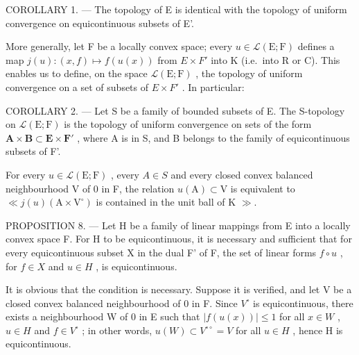 COROLLARY 1. --- The topology of E is identical with the topology of uniform convergence on equicontinuous subsets of E'.

More generally, let F be a locally convex space; every \(u \in \mathcal{L}(\mathrm{E}; \mathrm{F})\) defines a map \(j(u):(x, f) \mapsto f(u(x))\) from \(E \times F'\) into K (i.e.~into R or C). This enables us to define, on the space \(\mathcal{L}(\mathrm{E}; \mathrm{F})\) , the topology of uniform convergence on a set of subsets of \(E \times F'\) . In particular:

COROLLARY 2. --- Let S be a family of bounded subsets of E. The S-topology on \(\mathcal{L}(\mathrm{E};\mathrm{F})\) is the topology of uniform convergence on sets of the form \(\mathbf{A}\times\mathbf{B}\subset\mathbf{E}\times\mathbf{F}'\) , where A is in S, and B belongs to the family of equicontinuous subsets of F'.

For every \(u \in \mathcal{L}(\mathrm{E}; \mathrm{F})\) , every \(A \in S\) and every closed convex balanced neighbourhood V of 0 in F, the relation \(u(\mathrm{A}) \subset \mathrm{V}\) is equivalent to \(\ll j(u) (\mathrm{A} \times \mathrm{V}^{\circ})\) is contained in the unit ball of K \(\gg\).

PROPOSITION 8. --- Let H be a family of linear mappings from E into a locally convex space F. For H to be equicontinuous, it is necessary and sufficient that for every equicontinuous subset X in the dual F' of F, the set of linear forms \(f \circ u\) , for \(f \in X\) and \(u \in H\) , is equicontinuous.

It is obvious that the condition is necessary. Suppose it is verified, and let V be a closed convex balanced neighbourhood of 0 in F. Since \(V^{\circ}\) is equicontinuous, there exists a neighbourhood W of 0 in E such that \(\left|f(u(x))\right| \leqslant 1\) for all \(x \in W\) , \(u \in H\) and \(f \in V^{\circ}\) ; in other words, \(u(W) \subset V^{\circ\circ} = V\) for all \(u \in H\) , hence H is equicontinuous.

